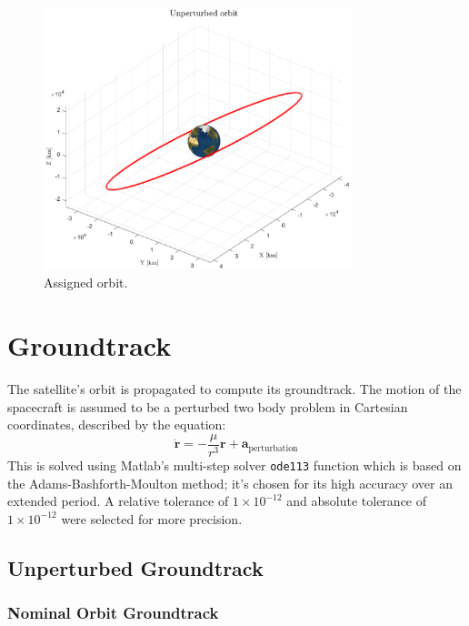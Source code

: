 \documentclass{article}
\begin{document}
\begin{figure}[H]
	\centering
	\includegraphics[width=0.8\textwidth]{nominal_orbit.eps}
	\caption{Assigned orbit.}
	\label{fig:nominal orbit}
\end{figure}

\section{Groundtrack}
The satellite's orbit is propagated to compute its groundtrack. The motion of the spacecraft is assumed to be a perturbed two body problem in Cartesian coordinates, described by the equation:
\[
\dot{\mathbf{r}} = -\frac{\mu}{r^3} \mathbf{r} + \mathbf{a}_{\text{perturbation}}
\]
This is solved using Matlab's multi-step solver \texttt{ode113} function which is based on the Adams-Bashforth-Moulton method; it's chosen for its high accuracy over an extended period. A relative tolerance of \(1 \times 10^{-12}\) and absolute tolerance of \(1 \times 10^{-12}\) were selected for more precision.


\subsection{Unperturbed Groundtrack}
\subsubsection{Nominal Orbit Groundtrack}
\end{document}
